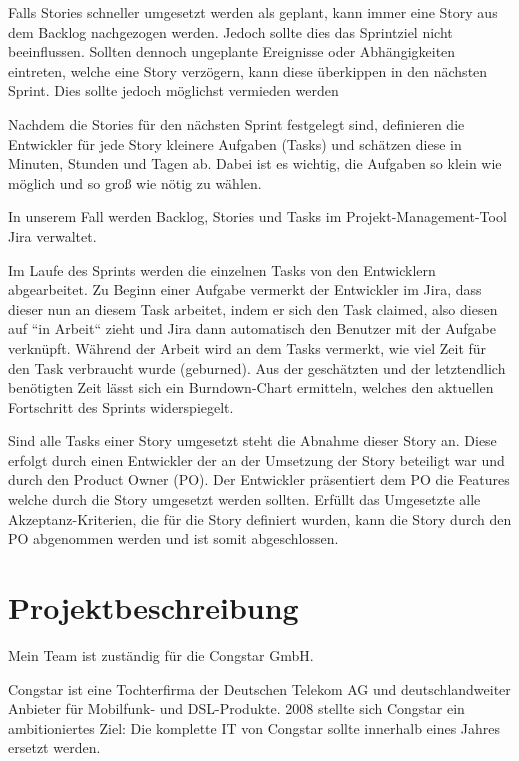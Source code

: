 \documentclass[11pt,a4paper]{article}
\begin{document}
Falls Stories schneller umgesetzt werden als geplant, kann immer eine Story aus dem Backlog nachgezogen werden. Jedoch sollte dies das Sprintziel nicht beeinflussen. Sollten dennoch ungeplante Ereignisse oder Abhängigkeiten eintreten, welche eine Story verzögern, kann diese überkippen in den nächsten Sprint. Dies sollte jedoch möglichst vermieden werden

Nachdem die Stories für den nächsten Sprint festgelegt sind, definieren die Entwickler für jede Story kleinere Aufgaben (Tasks) und schätzen diese in Minuten, Stunden und Tagen ab. Dabei ist es wichtig, die Aufgaben so klein wie möglich und so groß wie nötig zu wählen.

In unserem Fall werden Backlog, Stories und Tasks im Projekt-Management-Tool Jira verwaltet.

Im Laufe des Sprints werden die einzelnen Tasks von den Entwicklern abgearbeitet.
Zu Beginn einer Aufgabe vermerkt der Entwickler im Jira, dass dieser nun an diesem Task arbeitet, indem er sich den Task claimed, also diesen auf “in Arbeit“ zieht und Jira dann automatisch den Benutzer mit der Aufgabe verknüpft.
Während der Arbeit wird an dem Tasks vermerkt, wie viel Zeit für den Task verbraucht wurde (geburned). Aus der
geschätzten und der letztendlich benötigten Zeit lässt sich ein Burndown-Chart ermitteln, welches den aktuellen Fortschritt des Sprints widerspiegelt.

Sind alle Tasks einer Story umgesetzt steht die Abnahme dieser Story an. Diese erfolgt durch einen Entwickler der an der Umsetzung der Story beteiligt war und durch den Product Owner (PO).
Der Entwickler präsentiert dem PO die Features welche durch die Story umgesetzt werden sollten.
Erfüllt das Umgesetzte alle Akzeptanz-Kriterien, die für die Story definiert wurden, kann die Story durch den PO abgenommen werden und ist somit abgeschlossen.



\section{Projektbeschreibung} \label{sec:projekt}

Mein Team ist zuständig für die Congstar GmbH.

Congstar ist eine Tochterfirma der Deutschen Telekom AG und deutschlandweiter Anbieter für Mobilfunk- und DSL-Produkte.
2008 stellte sich Congstar ein ambitioniertes Ziel: Die komplette IT von Congstar sollte innerhalb eines Jahres ersetzt werden.
\end{document}
